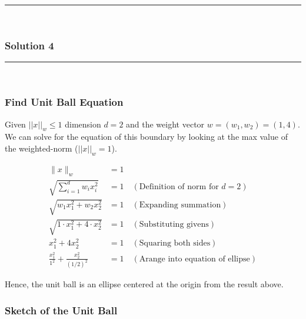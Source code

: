 \documentclass{article}
\begin{document}
\noindent\rule{\textwidth}{0.4pt}\\

\newpage

\subsubsection*{Solution 4}
\noindent\rule{\textwidth}{0.4pt}\\
\subsubsection*{Find Unit Ball Equation}
\parbox{\textwidth}{
  Given $||x||_w \leq 1$ dimension $d=2$ and the weight vector $w=(w_1, w_2) = (1, 4)$. We can solve for the equation of this boundary by looking at the max value of the weighted-norm ($||x||_w = 1$).
}
\begin{align*}
    \|x\|_w &= 1 \\
    \sqrt{\sum_{i=1}^d w_i x_i^2} &= 1  \quad (\text{Definition of norm for } d = 2) \\
    \sqrt{w_1 x_1^2 + w_2 x_2^2} &= 1  \quad (\text{Expanding summation}) \\
    \sqrt{1 \cdot x_1^2 + 4 \cdot x_2^2} &= 1 \quad (\text{Substituting givens}) \\ 
    x_1^2 + 4x_2^2 &= 1 \quad (\text{Squaring both sides}) \\
    \frac{x_1^2}{1^2} + \frac{x_2^2}{(1/2)^2} &= 1 \quad (\text{Arange into equation of ellipse})
\end{align*}
\parbox{\textwidth}{
Hence, the unit ball is an ellipse centered at the origin from the result above.
}

\subsubsection*{Sketch of the Unit Ball}
\begin{figure}[h!]
\centering
{}
\end{figure}
\end{document}
